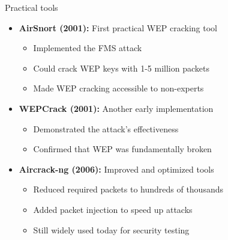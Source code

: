 \documentclass[aspectratio=169, lualatex, handout]{beamer}
\begin{document}
\begin{frame}{Practical tools}
	\begin{itemize}
		\item \textbf{AirSnort (2001):} First practical WEP cracking tool
		      \begin{itemize}
			      \item Implemented the FMS attack
			      \item Could crack WEP keys with 1-5 million packets
			      \item Made WEP cracking accessible to non-experts
		      \end{itemize}
		\item \textbf{WEPCrack (2001):} Another early implementation
		      \begin{itemize}
			      \item Demonstrated the attack's effectiveness
			      \item Confirmed that WEP was fundamentally broken
		      \end{itemize}
		\item \textbf{Aircrack-ng (2006):} Improved and optimized tools
		      \begin{itemize}
			      \item Reduced required packets to hundreds of thousands
			      \item Added packet injection to speed up attacks
			      \item Still widely used today for security testing
		      \end{itemize}
	\end{itemize}
\end{frame}
\end{document}
